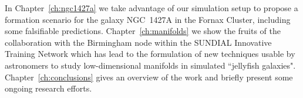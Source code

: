 In Chapter~\ref{ch:ngc1427a} \citep{Mastropietro2021} we take advantage of our simulation setup to propose a formation scenario for the galaxy NGC~1427A in the Fornax Cluster, including some falsifiable predictions.
Chapter~\ref{ch:manifolds} \citep{Canducci2021} we show the fruits of the collaboration with the Birmingham node within the SUNDIAL Innovative Training Network which has lead to the formulation of new techniques usable by astronomers to study low-dimensional manifolds in simulated ``jellyfish galaxies".
Chapter~\ref{ch:conclusions} gives an overview of the work and briefly present some ongoing research efforts.


